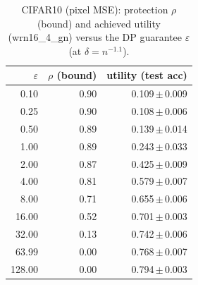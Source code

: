 \begin{table}[t]
  \centering
  \caption{CIFAR10 (pixel MSE): protection $\rho$ (bound) and achieved utility (wrn16_4_gn) versus the DP guarantee $\varepsilon$ (at $\delta=n^{-1.1}$).}
  \label{tab:util_cifar10_mse}
  \begin{tabular}{r r r}
    \toprule
    $\varepsilon$ & $\rho$ (bound) & utility (test acc) \\
    \midrule
    0.10 & 0.90 & 0.109\,$\pm$\,0.009 \\
    0.25 & 0.90 & 0.108\,$\pm$\,0.006 \\
    0.50 & 0.89 & 0.139\,$\pm$\,0.014 \\
    1.00 & 0.89 & 0.243\,$\pm$\,0.033 \\
    2.00 & 0.87 & 0.425\,$\pm$\,0.009 \\
    4.00 & 0.81 & 0.579\,$\pm$\,0.007 \\
    8.00 & 0.71 & 0.655\,$\pm$\,0.006 \\
    16.00 & 0.52 & 0.701\,$\pm$\,0.003 \\
    32.00 & 0.13 & 0.742\,$\pm$\,0.006 \\
    63.99 & 0.00 & 0.768\,$\pm$\,0.007 \\
    128.00 & 0.00 & 0.794\,$\pm$\,0.003 \\
    \bottomrule
  \end{tabular}
\end{table}
